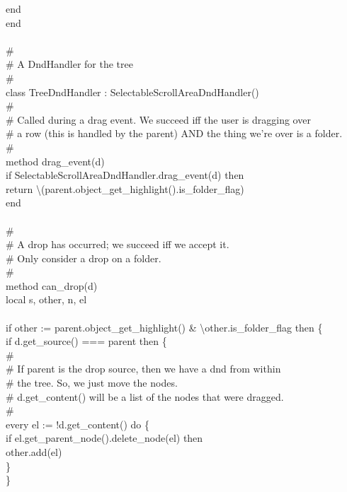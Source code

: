 {\>end \\
end \\
\ \\
\# \\
\# A DndHandler for the tree \\
\# \\
class TreeDndHandler : SelectableScrollAreaDndHandler() \\
\>\# \\
\>\# Called during a drag event. We succeed iff the user is dragging over \\
\>\# a row (this is handled by the parent) AND the thing we're over is a folder. \\
\>\# \\
\>method drag\_event(d) \\
\>\>if SelectableScrollAreaDndHandler.drag\_event(d) then \\
\>\>\>return {\textbackslash}(parent.object\_get\_highlight().is\_folder\_flag) \\
\>end \\
\ \\
\>\# \\
\>\# A drop has occurred; we succeed iff we accept it. \\
\>\# Only consider a drop on a folder. \\
\>\# \\
\>method can\_drop(d) \\
\>\>local s, other, n, el \\
\\
\>\>if other := parent.object\_get\_highlight() \& {\textbackslash}other.is\_folder\_flag then \{ \\
\>\>\>if d.get\_source() === parent then \{ \\
\>\>\>\>\# \\
\>\>\>\>\# If parent is the drop source, then we have a dnd from within \\
\>\>\>\>\# the tree. So, we just move the nodes. \\
\>\>\>\>\# d.get\_content() will be a list of the nodes that were dragged. \\
\>\>\>\>\# \\
\>\>\>\>every el := !d.get\_content() do \{ \\
\>\>\>\>\>if el.get\_parent\_node().delete\_node(el) then \\
\>\>\>\>\>\>other.add(el) \\
\>\>\>\>\>\} \\
\>\>\>\>\} \\
}
